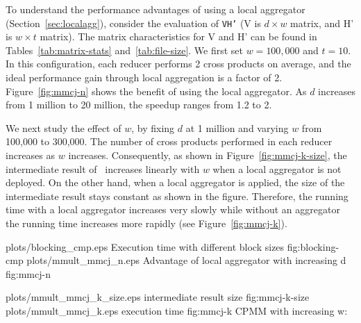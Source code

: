  To understand the performance advantages of using a 
local aggregator (Section~\ref{sec:localagg}), consider the evaluation of \texttt{V\mmult H'} (V is
$d\times w$ matrix, and H' is $w \times t$ matrix). The matrix characteristics for V and H' can be
found in Tables~\ref{tab:matrix-stats} and~\ref{tab:file-size}. We first set $w=100,000$ and
$t=10$. In this configuration, each reducer performs 2 cross products on average, and the ideal
performance gain through local aggregation is a factor of 2. Figure~\ref{fig:mmcj-n} shows the
benefit of using the local aggregator. As $d$ increases from 1 million to 20 million, the speedup
ranges from 1.2 to 2.

We next study the effect of $w$, by fixing $d$ at 1 million and varying $w$ from 100,000 to 300,000. The number of cross products performed in each reducer increases as $w$
increases. Consequently, as shown in Figure~\ref{fig:mmcj-k-size}, the intermediate result of
\mmcjlop\ increases linearly with $w$ when a local aggregator is not deployed. On the other hand,
when a local aggregator is applied, the size of the intermediate result stays constant as shown in
the figure. Therefore, the running time with a local aggregator increases very slowly while without an
aggregator the running time increases more rapidly (see Figure~\ref{fig:mmcj-k}).


\twosubfigures
{plots/blocking_cmp.eps}
{Execution time with different block sizes}
{fig:blocking-cmp}
{plots/mmult_mmcj_n.eps}
{Advantage of local aggregator with increasing d}
{fig:mmcj-n}
{}

\twosubfigures
{plots/mmult_mmcj_k_size.eps}
{intermediate result size}
{fig:mmcj-k-size}
{plots/mmult_mmcj_k.eps}
{execution time}
{fig:mmcj-k}
{CPMM with increasing w:}


%
%
